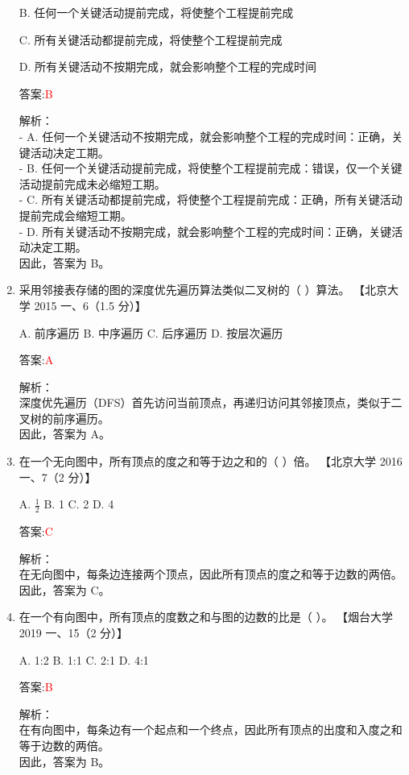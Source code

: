 \documentclass[lang=cn,newtx,10pt,scheme=chinese]{../../../elegantbook}
\begin{document}
\begin{enumerate}
    B. 任何一个关键活动提前完成，将使整个工程提前完成  

    C. 所有关键活动都提前完成，将使整个工程提前完成  

    D. 所有关键活动不按期完成，就会影响整个工程的完成时间  

    答案:\textcolor{red}{B}

    解析：\\
    - A. 任何一个关键活动不按期完成，就会影响整个工程的完成时间：正确，关键活动决定工期。\\
    - B. 任何一个关键活动提前完成，将使整个工程提前完成：错误，仅一个关键活动提前完成未必缩短工期。\\
    - C. 所有关键活动都提前完成，将使整个工程提前完成：正确，所有关键活动提前完成会缩短工期。\\
    - D. 所有关键活动不按期完成，就会影响整个工程的完成时间：正确，关键活动决定工期。\\
    因此，答案为 B。

\item 采用邻接表存储的图的深度优先遍历算法类似二叉树的（ ）算法。  
    【北京大学 2015 一、6（1.5 分）】  

    A. 前序遍历 \quad B. 中序遍历 \quad C. 后序遍历 \quad D. 按层次遍历  

    答案:\textcolor{red}{A}

    解析：\\
    深度优先遍历（DFS）首先访问当前顶点，再递归访问其邻接顶点，类似于二叉树的前序遍历。\\
    因此，答案为 A。

\item 在一个无向图中，所有顶点的度之和等于边之和的（ ）倍。  
    【北京大学 2016 一、7（2 分）】  

    A. $\frac{1}{2}$ \quad B. 1 \quad C. 2 \quad D. 4  

    答案:\textcolor{red}{C}

    解析：\\
    在无向图中，每条边连接两个顶点，因此所有顶点的度之和等于边数的两倍。\\
    因此，答案为 C。

\item 在一个有向图中，所有顶点的度数之和与图的边数的比是（ ）。  
    【烟台大学 2019 一、15（2 分）】  

    A. 1:2 \quad B. 1:1 \quad C. 2:1 \quad D. 4:1  

    答案:\textcolor{red}{B}

    解析：\\
    在有向图中，每条边有一个起点和一个终点，因此所有顶点的出度和入度之和等于边数的两倍。\\
    因此，答案为 B。


\end{enumerate}
\end{document}
